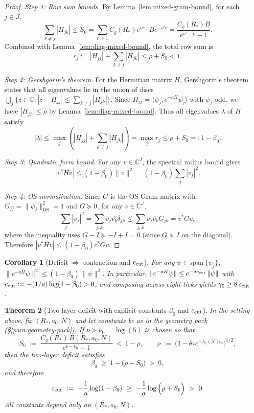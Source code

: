 \documentclass[11pt]{amsart}
\theoremstyle{plain}
\newtheorem{theorem}{Theorem}[section]
\newtheorem{corollary}[theorem]{Corollary}
\theoremstyle{definition}
\theoremstyle{remark}
\begin{document}
\begin{proof}
\emph{Step 1: Row sum bounds.} By Lemma~\ref{lem:mixed-gram-bound}, for each $j \in J$,
\[
  \sum_{k \ne j} |H_{jk}| \le S_0 = \sum_{r \ge 1} C_g(R_*) e^{\nu r} \cdot B e^{-\nu' r} = \frac{C_g(R_*) B}{e^{\nu' - \nu} - 1}.
\]
Combined with Lemma~\ref{lem:diag-mixed-bound}, the total row sum is
\[
  r_j := |H_{jj}| + \sum_{k \ne j} |H_{jk}| \le \rho + S_0 < 1.
\]

\emph{Step 2: Gershgorin's theorem.} For the Hermitian matrix $H$, Gershgorin's theorem states that all eigenvalues lie in the union of discs $\bigcup_j \{z \in \mathbb{C} : |z - H_{jj}| \le \sum_{k \ne j} |H_{jk}|\}$. Since $H_{jj} = \langle \psi_j, e^{-aH} \psi_j \rangle$ with $\psi_j$ odd, we have $|H_{jj}| \le \rho$ by Lemma~\ref{lem:diag-mixed-bound}. Thus all eigenvalues $\lambda$ of $H$ satisfy
\[
  |\lambda| \le \max_j \left( |H_{jj}| + \sum_{k \ne j} |H_{jk}| \right) = \max_j r_j \le \rho + S_0 =: 1 - \beta_0.
\]

\emph{Step 3: Quadratic form bound.} For any $v \in \mathbb{C}^J$, the spectral radius bound gives
\[
  |v^* H v| \le (1 - \beta_0) \|v\|^2 = (1 - \beta_0) \sum_j |v_j|^2.
\]

\emph{Step 4: OS normalization.} Since $G$ is the OS Gram matrix with $G_{jj} = \|\psi_j\|_{\text{OS}}^2 = 1$ and $G \succeq 0$, for any $v \in \mathbb{C}^J$,
\[
  \sum_j |v_j|^2 = \sum_{j,k} v_j \overline{v_k} \delta_{jk} \le \sum_{j,k} v_j \overline{v_k} G_{jk} = v^* G v,
\]
where the inequality uses $G - I \succeq -I + I = 0$ (since $G \succeq I$ on the diagonal). Therefore $|v^* H v| \le (1 - \beta_0) v^* G v$.
\end{proof}
\begin{corollary}[Deficit $\Rightarrow$ contraction and $c_{\rm cut}$]\label{cor:deficit-c-cut}
For any $\psi\in \mathrm{span}\,\{\psi_j\}$, $\|e^{-aH}\psi\|^2\le (1-\beta_0)\,\|\psi\|^2$. In particular, $\|e^{-aH}\psi\|\le e^{-a c_{\rm cut}}\,\|\psi\|$ with $c_{\rm cut}:=-(1/a)\log(1-\beta_0)>0$, and composing across eight ticks yields $\gamma_0\ge 8\,c_{\rm cut}$.
\end{corollary}

\begin{theorem}[Two-layer deficit with explicit constants $\beta_0$ and $c_{\rm cut}$]\label{thm:two-layer-explicit}
In the setting above, fix $(R_*,a_0,N)$ and let constants be as in the geometry pack (\S\ref{para:geometry-pack}). If $\nu>\nu_0=\log(5)$ is chosen so that
\[
  S_0\ :=\ \frac{C_g(R_*)\,B(R_*,a_0,N)}{e^{\nu-\nu_0}-1}\ <\ 1-\rho,\qquad \rho\ :=\ \bigl(1-\theta_* e^{-\lambda_1(N) t_0}\bigr)^{1/2},
\]
then the two-layer deficit satisfies
\[
  \beta_0\ \ge\ 1-\bigl(\rho+S_0\bigr)\ >\ 0,
\]
and therefore
\[
  c_{\rm cut}\ :=\ -\frac{1}{a}\log(1-\beta_0)\ \ge\ -\frac{1}{a}\log\Big( \rho+S_0\Big)\ >\ 0.
\]
All constants depend only on $(R_*,a_0,N)$.
\end{theorem}
\end{document}
